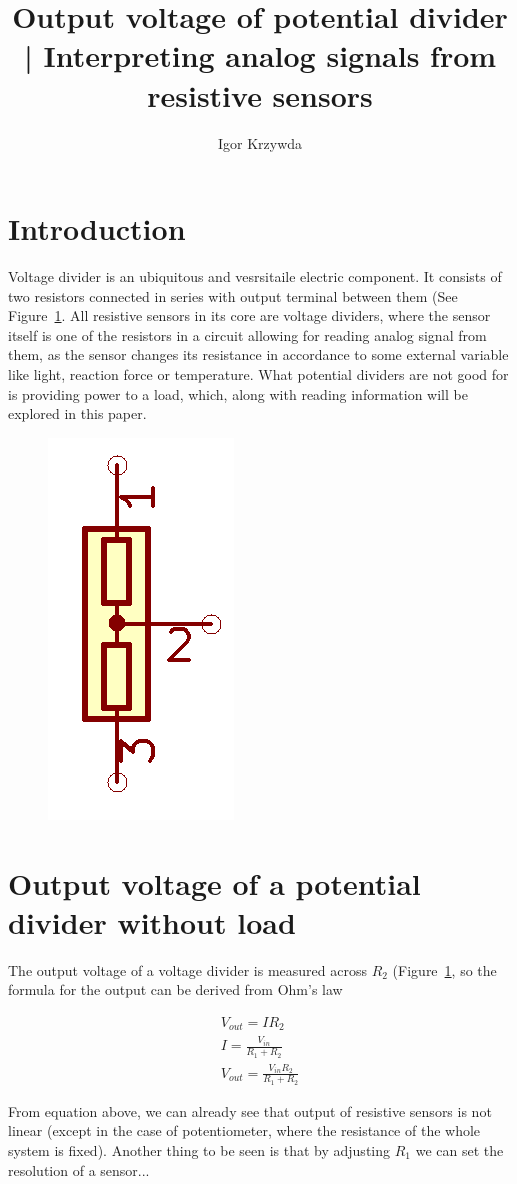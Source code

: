 \documentclass{article}
\title{Output voltage of potential divider | Interpreting analog signals from resistive sensors}
\author{Igor Krzywda}
\begin{document}
\maketitle

\section{Introduction}

    Voltage divider is an ubiquitous and vesrsitaile electric component. It consists of two resistors connected 
    in series with output terminal between them (See Figure~\ref{fig:divider_0}. All resistive sensors in its core are 
    voltage dividers, where the sensor itself is one of the resistors in a circuit allowing for reading analog signal from them, 
    as the sensor changes its resistance in accordance to some external variable like light, reaction force or
    temperature. What potential dividers are not good for is providing power to a load, which, along with reading information
    will be explored in this paper.

    \begin{figure}[H]
        \caption
        \centering
        \includegraphics[width=0.1\linewidth]{divider_0}
        \label{fig:divider_0}
    \end{figure}

\section{Output voltage of a potential divider without load}

    The output voltage of a voltage divider is measured across $R_2$ (Figure~\ref{fig:divider_0}, so the formula for the output
    can be derived from Ohm's law

    \begin{align}
        V_{out} = IR_2 \\
        I = \frac{V_{in}}{R_1 + R_2} \\
        V_{out} = \frac{V_{in}R_2}{R_1 + R_2} \label{eq:div_wo_load} 
    \end{align}

    From equation above, we can already see that output of resistive sensors is not linear (except in the case of potentiometer, 
    where the resistance of the whole system is fixed). Another thing to be seen is that by adjusting $R_1$ we can set the resolution
    of a sensor...
\end{document}
